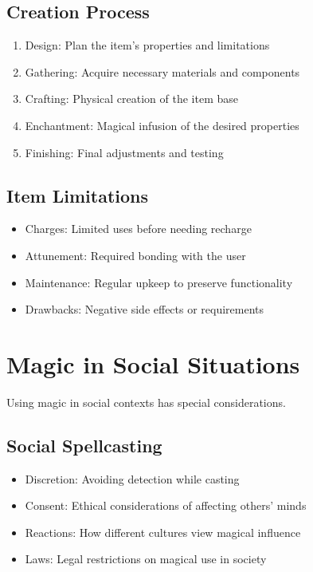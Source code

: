 \documentclass[11pt,twoside,openany]{book}
\begin{document}
\subsection*{Creation Process}

\begin{enumerate}
\item Design: Plan the item's properties and limitations
\item Gathering: Acquire necessary materials and components
\item Crafting: Physical creation of the item base
\item Enchantment: Magical infusion of the desired properties
\item Finishing: Final adjustments and testing
\end{enumerate}

\subsection*{Item Limitations}

\begin{itemize}
\item Charges: Limited uses before needing recharge
\item Attunement: Required bonding with the user
\item Maintenance: Regular upkeep to preserve functionality
\item Drawbacks: Negative side effects or requirements
\end{itemize}

\section*{Magic in Social Situations} 

Using magic in social contexts has special considerations.

\subsection*{Social Spellcasting}

\begin{itemize}
\item Discretion: Avoiding detection while casting
\item Consent: Ethical considerations of affecting others' minds
\item Reactions: How different cultures view magical influence
\item Laws: Legal restrictions on magical use in society
\end{itemize}
\end{document}

